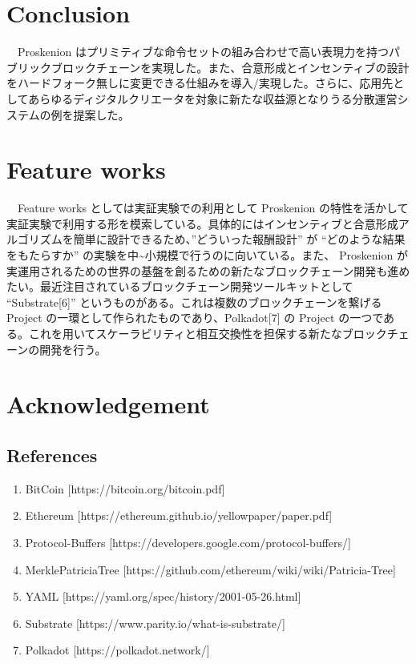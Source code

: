\hypertarget{conclusion}{%
\section{Conclusion}\label{conclusion}}

　Proskenion
はプリミティブな命令セットの組み合わせで高い表現力を持つパブリックブロックチェーンを実現した。また、合意形成とインセンティブの設計をハードフォーク無しに変更できる仕組みを導入/実現した。さらに、応用先としてあらゆるディジタルクリエータを対象に新たな収益源となりうる分散運営システムの例を提案した。

\hypertarget{feature-works}{%
\section{Feature works}\label{feature-works}}

　Feature works としては実証実験での利用として Proskenion
の特性を活かして実証実験で利用する形を模索している。具体的にはインセンティブと合意形成アルゴリズムを簡単に設計できるため、''どういった報酬設計''
が ``どのような結果をもたらすか''
の実験を中\textasciitilde 小規模で行うのに向いている。また、 Proskenion
が実運用されるための世界の基盤を創るための新たなブロックチェーン開発も進めたい。最近注目されているブロックチェーン開発ツールキットとして
``Substrate{[}6{]}''
というものがある。これは複数のブロックチェーンを繋げる Project
の一環として作られたものであり、Polkadot{[}7{]} の Project
の一つである。これを用いてスケーラビリティと相互交換性を担保する新たなブロックチェーンの開発を行う。

\hypertarget{acknowledgement}{%
\section{Acknowledgement}\label{acknowledgement}}

\hypertarget{references}{%
\subsection{References}\label{references}}

\begin{enumerate}
\def\labelenumi{\arabic{enumi}.}
\tightlist
\item
  BitCoin {[}https://bitcoin.org/bitcoin.pdf{]}
\item
  Ethereum {[}https://ethereum.github.io/yellowpaper/paper.pdf{]}
\item
  Protocol-Buffers {[}https://developers.google.com/protocol-buffers/{]}
\item
  MerklePatriciaTree
  {[}https://github.com/ethereum/wiki/wiki/Patricia-Tree{]}
\item
  YAML {[}https://yaml.org/spec/history/2001-05-26.html{]}
\item
  Substrate {[}https://www.parity.io/what-is-substrate/{]}
\item
  Polkadot {[}https://polkadot.network/{]}
\end{enumerate}
